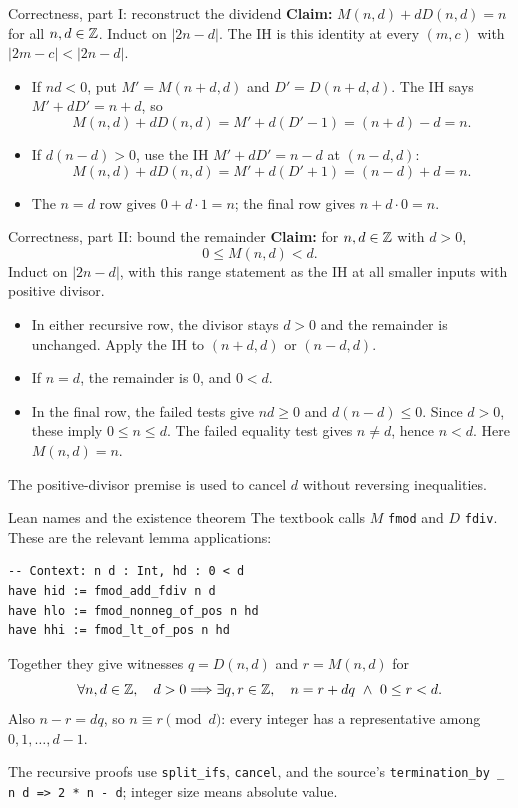 \begin{frame}{Correctness, part I: reconstruct the dividend}
\textbf{Claim:} $M(n,d)+dD(n,d)=n$ for all $n,d\in\mathbb{Z}$.
Induct on $|2n-d|$. The IH is this identity at every $(m,c)$ with
$|2m-c|<|2n-d|$.
\begin{itemize}
\item If $nd<0$, put $M'=M(n+d,d)$ and $D'=D(n+d,d)$.
The IH says $M'+dD'=n+d$, so
\[
 M(n,d)+dD(n,d)=M'+d(D'-1)=(n+d)-d=n.
\]
\item If $d(n-d)>0$, use the IH $M'+dD'=n-d$ at $(n-d,d)$:
\[
 M(n,d)+dD(n,d)=M'+d(D'+1)=(n-d)+d=n.
\]
\item The $n=d$ row gives $0+d\cdot1=n$;
the final row gives $n+d\cdot0=n$.
\end{itemize}
\end{frame}

\begin{frame}{Correctness, part II: bound the remainder}
\textbf{Claim:} for $n,d\in\mathbb{Z}$ with $d>0$,
\[
 0\le M(n,d)<d.
\]
Induct on $|2n-d|$, with this range statement as the IH at all smaller
inputs with positive divisor.
\begin{itemize}
\item In either recursive row, the divisor stays $d>0$ and the remainder
is unchanged. Apply the IH to $(n+d,d)$ or $(n-d,d)$.
\item If $n=d$, the remainder is $0$, and $0<d$.
\item In the final row, the failed tests give $nd\ge0$ and
$d(n-d)\le0$. Since $d>0$, these imply $0\le n\le d$.
The failed equality test gives $n\ne d$, hence $n<d$.
Here $M(n,d)=n$.
\end{itemize}
The positive-divisor premise is used to cancel $d$ without reversing inequalities.
\end{frame}

\begin{frame}[fragile]{Lean names and the existence theorem}
The textbook calls $M$ \texttt{fmod} and $D$ \texttt{fdiv}.
These are the relevant lemma applications:
\begin{lstlisting}
-- Context: n d : Int, hd : 0 < d
have hid := fmod_add_fdiv n d
have hlo := fmod_nonneg_of_pos n hd
have hhi := fmod_lt_of_pos n hd
\end{lstlisting}
Together they give witnesses $q=D(n,d)$ and $r=M(n,d)$ for
\[
 \forall n,d\in\mathbb{Z},\quad d>0\Longrightarrow
 \exists q,r\in\mathbb{Z},\quad n=r+dq\ \land\ 0\le r<d.
\]
Also $n-r=dq$, so $n\equiv r\pmod d$: every integer has a representative
among $0,1,\ldots,d-1$.

The recursive proofs use \texttt{split\_ifs}, \texttt{cancel}, and the source's
\texttt{termination\_by \_ n d => 2 * n - d}; integer size means absolute value.
\end{frame}

